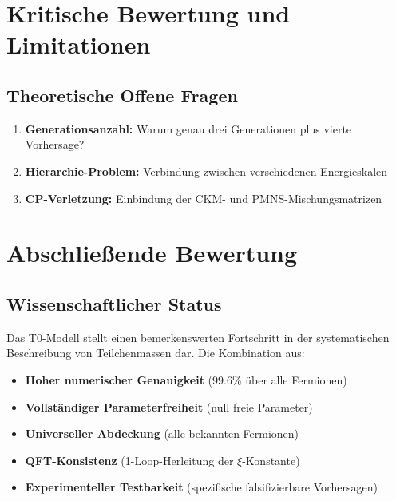 \documentclass[12pt,a4paper]{article}
\begin{document}
	

	\section{Kritische Bewertung und Limitationen}
	\label{sec:kritische_bewertung}
	
	
	\subsection{Theoretische Offene Fragen}
	\label{subsec:offene_fragen}
	
	\begin{enumerate}
		
		\item \textbf{Generationsanzahl:} Warum genau drei Generationen plus vierte Vorhersage?
		\item \textbf{Hierarchie-Problem:} Verbindung zwischen verschiedenen Energieskalen
		\item \textbf{CP-Verletzung:} Einbindung der CKM- und PMNS-Mischungsmatrizen
	\end{enumerate}
	
	\section{Abschließende Bewertung}
	\label{sec:abschliessende_bewertung}
	
	\subsection{Wissenschaftlicher Status}
	\label{subsec:wissenschaftlicher_status}
	
	Das T0-Modell stellt einen bemerkenswerten Fortschritt in der systematischen Beschreibung von Teilchenmassen dar. Die Kombination aus:
	
	\begin{itemize}
		\item \textbf{Hoher numerischer Genauigkeit} (99.6\% über alle Fermionen)
		\item \textbf{Vollständiger Parameterfreiheit} (null freie Parameter)
		\item \textbf{Universeller Abdeckung} (alle bekannten Fermionen)
		\item \textbf{QFT-Konsistenz} (1-Loop-Herleitung der $\xi$-Konstante)
		\item \textbf{Experimenteller Testbarkeit} (spezifische falsifizierbare Vorhersagen)
	\end{itemize}
	
\end{document}
